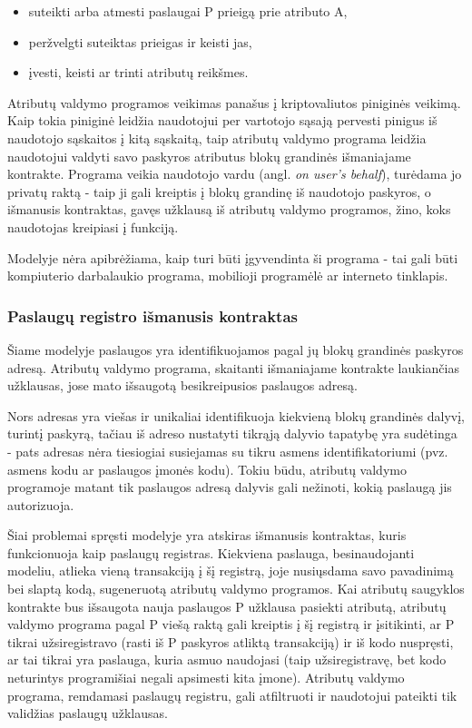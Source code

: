 \begin{itemize}
    \item suteikti arba atmesti paslaugai P prieigą prie atributo A,
    \item peržvelgti suteiktas prieigas ir keisti jas,
    \item įvesti, keisti ar trinti atributų reikšmes.
\end{itemize}

Atributų valdymo programos veikimas panašus į kriptovaliutos piniginės veikimą. Kaip tokia piniginė leidžia naudotojui per vartotojo sąsają
pervesti pinigus iš naudotojo sąskaitos į kitą sąskaitą, taip atributų valdymo programa leidžia naudotojui
valdyti savo paskyros atributus blokų grandinės išmaniajame kontrakte. Programa veikia naudotojo vardu (angl. \textit{on user's behalf}),
turėdama jo privatų raktą
- taip ji gali kreiptis į blokų grandinę
iš naudotojo paskyros, o išmanusis kontraktas, gavęs užklausą iš atributų valdymo programos,
žino, koks naudotojas kreipiasi į funkciją.

Modelyje nėra apibrėžiama, kaip turi būti įgyvendinta ši programa - tai gali būti kompiuterio darbalaukio programa,
mobilioji programėlė ar interneto tinklapis. 

\subsubsection{Paslaugų registro išmanusis kontraktas} \label{BCIDM:serviceRegister}

Šiame modelyje paslaugos yra identifikuojamos pagal jų blokų grandinės paskyros adresą. Atributų valdymo programa,
skaitanti išmaniajame kontrakte laukiančias užklausas, jose mato išsaugotą besikreipusios paslaugos adresą.

Nors adresas yra viešas ir unikaliai identifikuoja kiekvieną blokų grandinės dalyvį, turintį paskyrą, tačiau iš adreso nustatyti tikrąją dalyvio tapatybę yra sudėtinga -
pats adresas nėra tiesiogiai susiejamas su tikru asmens identifikatoriumi (pvz. asmens kodu ar paslaugos įmonės kodu).
Tokiu būdu, atributų valdymo programoje matant tik paslaugos adresą dalyvis gali nežinoti, kokią paslaugą jis autorizuoja.

Šiai problemai spręsti modelyje yra atskiras išmanusis kontraktas, kuris funkcionuoja kaip paslaugų registras. Kiekviena
paslauga, besinaudojanti modeliu, atlieka vieną transakciją į šį registrą, joje nusiųsdama savo pavadinimą bei slaptą kodą,
sugeneruotą atributų valdymo programos. Kai atributų saugyklos kontrakte bus išsaugota nauja paslaugos
P užklausa pasiekti atributą, atributų valdymo programa pagal P viešą raktą gali kreiptis
į šį registrą ir įsitikinti, ar P tikrai užsiregistravo (rasti iš P paskyros atliktą transakciją) ir iš kodo
nuspręsti, ar tai tikrai yra paslauga, kuria asmuo naudojasi (taip užsiregistravę, bet kodo neturintys programišiai negali
apsimesti kita įmone). Atributų valdymo programa, remdamasi paslaugų registru, gali atfiltruoti ir naudotojui pateikti tik
validžias paslaugų užklausas.

